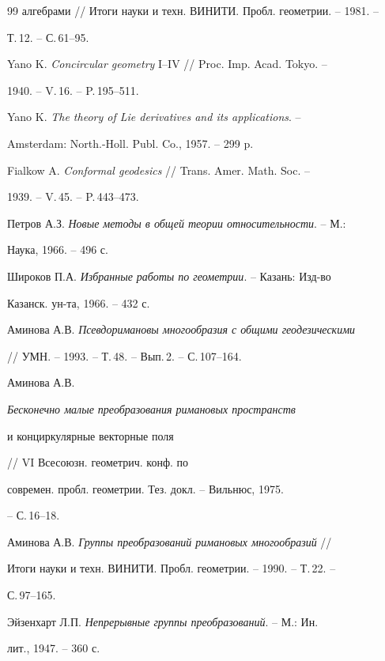 \begin{thebibliography}{99}
{алгебрами} // Итоги науки и техн. ВИНИТИ. Пробл. геометрии. -- 1981. --


Т.\,12. -- С.\,61--95.




Yano K. {\em Concircular geometry} I--IV // Proc. Imp. Acad. Tokyo. --


1940. -- V.\,16. -- P.\,195--511.




Yano K. {\em The theory of Lie derivatives and its applications}. --


Amsterdam: North.-Holl. Publ. Co., 1957. -- 299 p.




Fialkow A. {\em Conformal geodesics} // Trans. Amer. Math. Soc. --


1939. -- V.\,45. -- P.\,443--473.




Петров А.З. {\em Новые методы в общей теории относительности}. -- М.:


Наука, 1966. -- 496 с.




Широков П.А. {\em Избранные работы по геометрии}. -- Казань: Изд-во


Казанск. ун-та, 1966. -- 432 с.




Аминова А.В. {\em Псевдоримановы многообразия с общими геодезическими}


// УМН. -- 1993. -- Т.\,48. -- Вып.\,2. -- С.\,107--164.




Аминова А.В. {\em Бесконечно малые преобразования римановых пространств


и конциркулярные векторные поля} // VI Всесоюзн. геометрич. конф. по


современ. пробл. геометрии. Тез. докл. -- Вильнюс, 1975.


-- С.\,16--18.




Аминова А.В. {\em Группы преобразований римановых многообразий} //


Итоги науки и техн. ВИНИТИ. Пробл. геометрии. -- 1990. -- Т.\,22. --


С.\,97--165.




Эйзенхарт Л.П. {\em Непрерывные группы преобразований}. -- М.: Ин.


лит., 1947. -- 360 с.



\end{thebibliography}
